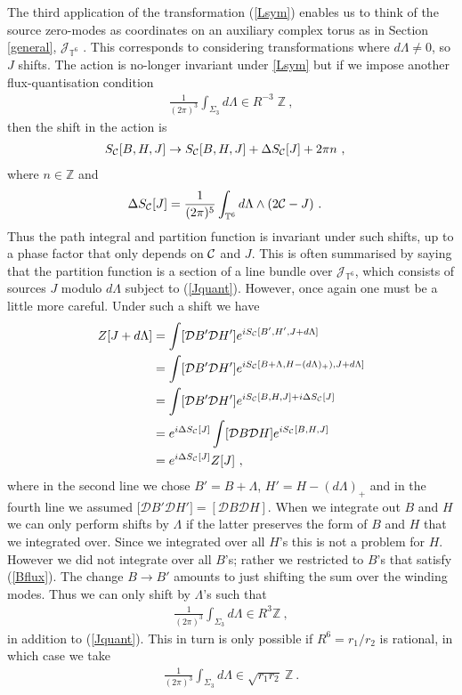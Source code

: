 \documentclass[11pt]{article}
\numberwithin{equation}{section}
\begin{document}
The third application of the transformation  (\ref{Lsym}) enables us to think of the source zero-modes  as coordinates on an auxiliary complex torus as in Section \ref{general}, $\mathcal J_{\mathbb T^6}$ \cite{Witten:1996hc}. This corresponds to considering transformations where $d\Lambda \ne 0 $, so $J$ shifts. The action is no-longer invariant under \eqref{Lsym} but if we impose another flux-quantisation condition
\begin{align}\label{Jquant}
	\frac{1}{(2\pi)^3 }\int_{\Sigma_3} d\Lambda \in  R^{-3}\;{\mathbb Z}\ ,
\end{align}
then the shift in the action is 
\begin{align}
	S_{\cal C}[B,H,J]&\to  S_{\cal C}[B,H,  J]+ \Delta S_{\cal C}[J]+ 2\pi n\ ,
	\end{align}
	where   $n\in {\mathbb Z}$ and 
	\begin{align}
	\Delta S_{\cal C}[ J]   &= \frac{1}{(2\pi )^5}\int_{\mathbb{T}^{6}} d\Lambda\wedge ( 2{\cal C}-J) \ . 
\end{align}
Thus the path integral and partition function is invariant under such shifts, up to a phase factor that only depends on ${\cal C}$ and $ J$. This is often summarised by saying that the partition function is a section of a line bundle over $\mathcal J_{\mathbb T^6}$, which consists of sources $ J$ modulo $d\Lambda$ subject to (\ref{Jquant}). However, once again one must be a little more careful. Under such a shift we have 
\begin{align}
Z[ J+d\Lambda] & = \int [\mathcal DB'\mathcal DH'] e^{i S_{\cal C}[B',H', J+d\Lambda]}\nonumber\\
& = 	 \int [\mathcal DB'\mathcal DH'] e^{i S_{\cal C}[B+\Lambda,H-(d\Lambda)_+), J+d\Lambda]}\nonumber\\
&=\int [\mathcal D B'\mathcal DH'] e^{i S_{\cal C}[B,H,J]+i\Delta S_{\cal C}[ J]}\nonumber\\
&=e^{i\Delta S_{\cal C}[ J]}\int [\mathcal DB\mathcal DH] e^{i S_{\cal C}[B,H, J]}\nonumber\\
& = e^{i\Delta S_{\cal C}[J]}Z[ J]\ ,
\end{align}
where in the second line we chose $B'=B+\Lambda$, $H'=H-(d\Lambda)_+$ and in the fourth line we assumed $\mathcal [\mathcal DB'\mathcal DH']=[\mathcal DB\mathcal DH]$. When we integrate out $B$ and $H$ we can only perform shifts by   $\Lambda$ if the latter  preserves the form of $B$ and $H$ that we integrated over. Since we integrated over all $H$'s this is not a problem for $H$. However we did not integrate over all $B$'s; rather we restricted to $B$'s that satisfy (\ref{Bflux}). The change $B\to B'$ amounts to just shifting the sum over the winding modes. Thus we can only shift by $\Lambda$'s such that
\begin{align}\label{con1}
\frac{1}{(2\pi   )^3}\int_{\Sigma_3} d\Lambda	\in R^3{\mathbb Z}\ ,
\end{align}
in addition to (\ref{Jquant}). This in turn is only possible if $R^6=r_1/r_2$ is rational, in which case we take
\begin{align}
\frac{1}{(2\pi   )^3}\int_{\Sigma_3} d\Lambda	\in \sqrt{r_1r_2}\ {\mathbb Z}\ .
\end{align}
\end{document}
